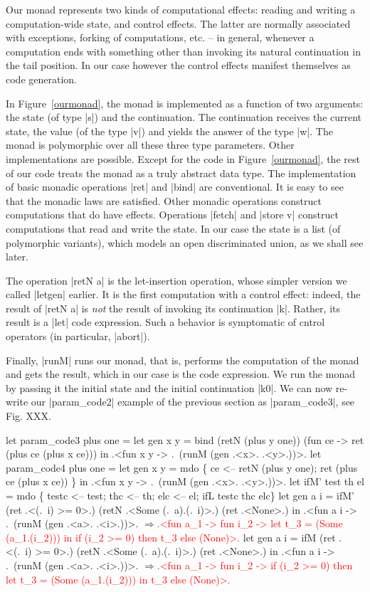 \documentclass{llncs}
\newcommand{\evalresult}[1]{\ensuremath{\Longrightarrow}\textcolor{red}{#1}}
\begin{document}
Our monad represents two kinds of computational effects: reading and
writing a computation-wide state, and control effects. The latter are
normally associated with exceptions, forking of computations, etc. --
in general, whenever a computation ends with something other than
invoking its natural continuation in the tail position. In our case
however the control effects manifest themselves as code generation.

In Figure~\ref{ourmonad}, the monad is implemented as a function of two
arguments: the state (of type |s|) and the continuation. The
continuation receives the current state, the value (of the type |v|) and
yields the answer of the type |w|.  The monad is polymorphic over all
these three type parameters.  Other implementations are
possible. Except for the code in Figure~\ref{ourmonad}, the rest of our code
treats the monad as a truly abstract data type. The implementation of basic
monadic operations |ret| and |bind| are conventional. It is easy to
see that the monadic laws are satisfied.  Other monadic operations
construct computations that do have effects.  Operations |fetch| and
|store v| construct computations that read and write the state. In our
case the state is a list (of polymorphic variants), which models an
open discriminated union, as we shall see later.

The operation |retN a| is the let-insertion operation, whose simpler
version we called |letgen| earlier. It is the first computation with
a control effect: indeed, the result of |retN a| is \emph{not} the
result of invoking its continuation |k|. Rather, its result is a |let|
code expression. Such a behavior is symptomatic of cntrol operators
(in particular, |abort|).

Finally, |runM| runs our monad, that is, performs the computation of
the monad and gets the result, which in our case is the code
expression. We run the monad by passing it the initial state and the
initial continuation |k0|. We can now re-write our |param_code2|
example of the previous section as |param_code3|, see Fig. XXX.

\begin{figure*}
\begin{code}
let param_code3 plus one =
  let gen x y = bind (retN (plus y one)) (fun ce -> 
                ret (plus ce (plus x ce)))
  in .<fun x y -> .~(runM (gen .<x>. .<y>.))>.
let param_code4 plus one =
  let gen x y = mdo \{ ce <-- retN (plus y one);
                      ret (plus ce (plus x ce)) \}
  in .<fun x y -> .~(runM (gen .<x>. .<y>.))>.
let ifM' test th el = mdo \{
  testc <-- test; thc <-- th; elc <-- el;
  ifL testc thc elc\}
let gen a i = ifM' (ret .<(.~i) >= 0>.) (retN .<Some (.~a).(.~i)>.) (ret .<None>.)
 in .<fun a i -> .~(runM (gen .<a>. .<i>.))>.
\evalresult{.<fun a_1 -> fun i_2 -> 
    let t_3 = (Some (a_1.(i_2))) in if (i_2 >= 0) then t_3 else (None)>.}
let gen a i = ifM (ret .<(.~i) >= 0>.) (retN .<Some (.~a).(.~i)>.) (ret .<None>.)
 in .<fun a i -> .~(runM (gen .<a>. .<i>.))>.
\evalresult{.<fun a_1 -> fun i_2 ->
    if (i_2 >= 0) then let t_3 = (Some (a_1.(i_2))) in t_3 else (None)>.}
\end{code}
\end{figure*}
\end{document}
